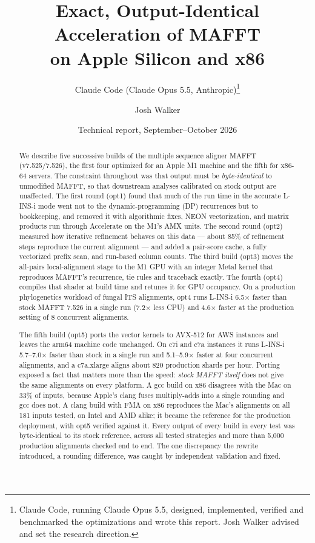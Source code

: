 \documentclass[11pt]{article}
\title{Exact, Output-Identical Acceleration of MAFFT\\on Apple Silicon and x86}
\author{Claude Code (Claude Opus 5.5, Anthropic)\thanks{Claude Code, running Claude Opus 5.5,
designed, implemented, verified and benchmarked the optimizations and wrote this report.
Josh Walker advised and set the research direction.} \and Josh Walker}
\date{Technical report, September--October 2026}
\begin{document}
\maketitle

\begin{abstract}
We describe five successive builds of the multiple sequence aligner MAFFT (v7.525/7.526),
the first four optimized for an Apple M1 machine and the fifth for x86-64 servers. The
constraint throughout was that output must be \emph{byte-identical} to unmodified MAFFT, so
that downstream analyses calibrated on stock output are unaffected. The first round (opt1)
found that much of the run time in the accurate L-INS-i mode went not to the
dynamic-programming (DP) recurrences but to bookkeeping, and removed it with algorithmic
fixes, NEON vectorization, and matrix products run through Accelerate on the M1's AMX units.
The second round (opt2) measured how iterative refinement behaves on this data --- about 85\%
of refinement steps reproduce the current alignment --- and added a pair-score cache, a fully
vectorized prefix scan, and run-based column counts. The third build (opt3) moves the
all-pairs local-alignment stage to the M1 GPU with an integer Metal kernel that reproduces
MAFFT's recurrence, tie rules and traceback exactly. The fourth (opt4) compiles that shader
at build time and retunes it for GPU occupancy. On a production phylogenetics workload of
fungal ITS alignments, opt4 runs L-INS-i 6.5$\times$ faster than stock MAFFT 7.526 in a
single run (7.2$\times$ less CPU) and 4.6$\times$ faster at the production setting of 8
concurrent alignments.

The fifth build (opt5) ports the vector kernels to AVX-512 for AWS instances and leaves the
arm64 machine code unchanged. On c7i and c7a instances it runs L-INS-i 5.7--7.0$\times$
faster than stock in a single run and 5.1--5.9$\times$ faster at four concurrent alignments,
and a c7a.xlarge aligns about 820 production shards per hour. Porting
exposed a fact that matters more than the speed: \emph{stock MAFFT itself} does not give the
same alignments on every platform. A gcc build on x86 disagrees with the Mac on 33\% of
inputs, because Apple's clang fuses multiply-adds into a single rounding and gcc does not.
A clang build with FMA on x86 reproduces the Mac's alignments on all 181 inputs tested, on
Intel and AMD alike; it became the reference for the production deployment, with opt5
verified against it. Every output of every build in every test was byte-identical to its
stock reference, across all tested strategies and more than 5{,}000 production alignments
checked end to end. The one discrepancy the rewrite introduced, a rounding difference, was
caught by independent validation and fixed.
\end{abstract}
\end{document}
